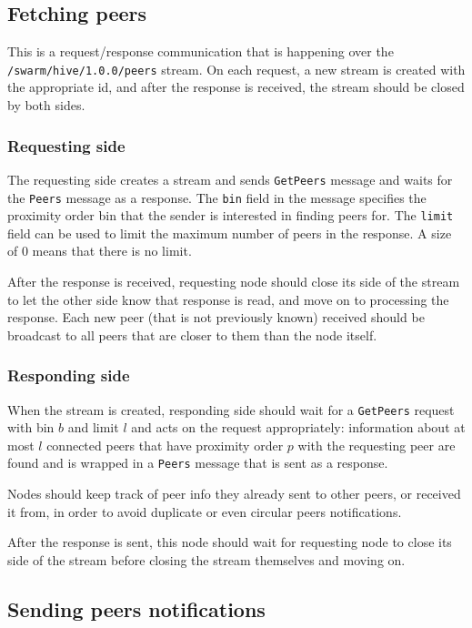 \subsection{Fetching peers}

This is a request/response communication that is happening over the \texttt{/swarm/hive/1.0.0/peers} stream. On each request, a new stream is created with the appropriate id, and after the response is received, the stream should be closed by both sides.

\subsubsection{Requesting side}

The requesting side creates a stream and sends \texttt{GetPeers} message and waits for the \texttt{Peers} message as a response. The \texttt{bin} field in the message specifies the proximity order bin that the sender is interested in finding peers for. The \texttt{limit} field can be used to limit the maximum number of peers in the response. A size of 0 means that there is no limit. 

After the response is received, requesting node should close its side of the stream to let the other side know that response is read, and move on to processing the response. Each new peer (that is not previously known) received should be broadcast to all peers that are closer to them than the node itself.

\subsubsection{Responding side}

When the stream is created, responding side should wait for a \texttt{GetPeers} request with bin $b$ and limit $l$ and acts on the request appropriately: information about at most $l$ connected peers that have proximity order $p$ with the requesting peer are found and is wrapped in a \texttt{Peers} message that is sent as a response.

Nodes should keep track of peer info they already sent to other peers, or received it from, in order to avoid  duplicate or even circular peers notifications.

After the response is sent, this node should wait for requesting node to close its side of the stream before closing the stream themselves and moving on.

\subsection{Sending peers notifications}

